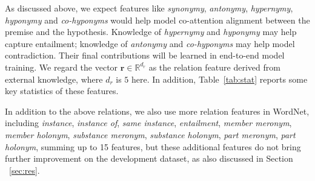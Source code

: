 \documentclass[11pt,a4paper]{article}
\newcommand{\vect}[1]{\bm{#1}}
\newcommand{\RR}{\mathbb{R}}
\begin{document}
As discussed above, we expect features like \textit{synonymy}, \textit{antonymy}, \textit{hypernymy}, \textit{hyponymy} and \textit{co-hyponyms} would help model co-attention alignment between the premise and the hypothesis. Knowledge of \textit{hypernymy} and \textit{hyponymy} may help capture entailment; knowledge of \textit{antonymy} and \textit{co-hyponyms} may help model contradiction. Their final contributions will be learned in end-to-end model training. We regard the vector ${\vect r}\in \RR^{d_r}$ as the relation feature derived from external knowledge, where $d_r$ is $5$ here. In addition, Table~\ref{tab:stat} reports some key statistics of these features.

\begin{table}[ht]
\renewcommand{\arraystretch}{0.9}
\begin{center}
\end{center}
\caption{Statistics of lexical relation features.}
\label{tab:stat}
\end{table}

In addition to the above relations, we also use more relation features in WordNet, including \textit{instance}, \textit{instance of}, \textit{same instance}, \textit{entailment}, \textit{member meronym}, \textit{member holonym}, \textit{substance meronym}, \textit{substance holonym}, \textit{part meronym}, \textit{part holonym}, summing up to 15 features, but these additional features do not bring further improvement on the development dataset, as also discussed in Section ~\ref{sec:res}. 
\end{document}
